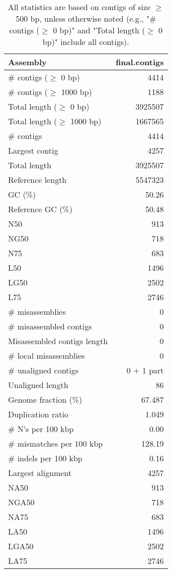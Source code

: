 \documentclass[12pt,a4paper]{article}
\begin{document}
\begin{table}[ht]
\begin{center}
\caption{All statistics are based on contigs of size $\geq$ 500 bp, unless otherwise noted (e.g., "\# contigs ($\geq$ 0 bp)" and "Total length ($\geq$ 0 bp)" include all contigs).}
\begin{tabular}{|l*{1}{|r}|}
\hline
Assembly & final.contigs \\ \hline
\# contigs ($\geq$ 0 bp) & 4414 \\ \hline
\# contigs ($\geq$ 1000 bp) & 1188 \\ \hline
Total length ($\geq$ 0 bp) & 3925507 \\ \hline
Total length ($\geq$ 1000 bp) & 1667565 \\ \hline
\# contigs & 4414 \\ \hline
Largest contig & 4257 \\ \hline
Total length & 3925507 \\ \hline
Reference length & 5547323 \\ \hline
GC (\%) & 50.26 \\ \hline
Reference GC (\%) & 50.48 \\ \hline
N50 & 913 \\ \hline
NG50 & 718 \\ \hline
N75 & 683 \\ \hline
L50 & 1496 \\ \hline
LG50 & 2502 \\ \hline
L75 & 2746 \\ \hline
\# misassemblies & 0 \\ \hline
\# misassembled contigs & 0 \\ \hline
Misassembled contigs length & 0 \\ \hline
\# local misassemblies & 0 \\ \hline
\# unaligned contigs & 0 + 1 part \\ \hline
Unaligned length & 86 \\ \hline
Genome fraction (\%) & 67.487 \\ \hline
Duplication ratio & 1.049 \\ \hline
\# N's per 100 kbp & 0.00 \\ \hline
\# mismatches per 100 kbp & 128.19 \\ \hline
\# indels per 100 kbp & 0.16 \\ \hline
Largest alignment & 4257 \\ \hline
NA50 & 913 \\ \hline
NGA50 & 718 \\ \hline
NA75 & 683 \\ \hline
LA50 & 1496 \\ \hline
LGA50 & 2502 \\ \hline
LA75 & 2746 \\ \hline
\end{tabular}
\end{center}
\end{table}
\end{document}
